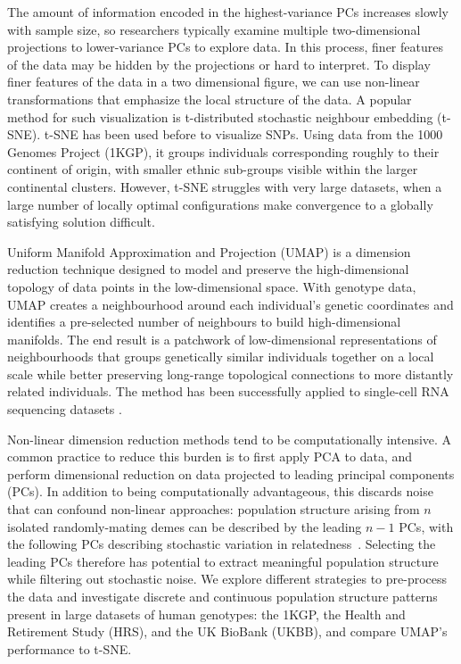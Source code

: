 The amount of information encoded in the highest-variance PCs increases slowly with sample size, so researchers typically examine multiple two-dimensional projections to lower-variance PCs to explore data. In this process, finer features of the data may be hidden by the projections or hard to interpret. To display finer features of the data in a two dimensional figure, we can use non-linear transformations that emphasize the local structure of the data. A popular method for such visualization is t-distributed stochastic neighbour embedding (t-SNE)\citep{maaten_visualizing_2008}. t-SNE has been used before to visualize SNPs\citep{platzer2013visualization}. Using data from the 1000 Genomes Project (1KGP)\citep{10002015global}, it groups individuals corresponding roughly to their continent of origin, with smaller ethnic sub-groups visible within the larger continental clusters\citep{li2017tsne}. However, t-SNE struggles with very large datasets, when a large number of locally optimal configurations make convergence to a globally satisfying solution difficult.

Uniform Manifold Approximation and Projection (UMAP) is a dimension reduction technique designed to model and preserve the high-dimensional topology of data points in the low-dimensional space\citep{2018arXivUMAP}. With genotype data, UMAP creates a neighbourhood around each individual's genetic coordinates and identifies a pre-selected number of neighbours to build high-dimensional manifolds. The end result is a patchwork of low-dimensional representations of neighbourhoods that groups genetically similar individuals together on a local scale while better preserving long-range topological connections to more distantly related individuals. The method has been successfully applied to single-cell RNA sequencing datasets \citep{umap2018singlecell}.

Non-linear dimension reduction methods tend to be computationally intensive. A common practice to reduce this burden is to first apply PCA to data, and perform dimensional reduction on data projected to leading principal components (PCs). In addition to being computationally advantageous, this discards noise that can confound non-linear approaches: population structure arising from $n$ isolated randomly-mating demes can be described by the leading $n-1$ PCs, with the following PCs describing stochastic variation in relatedness~\citep{eigen2006}. Selecting the leading PCs therefore has potential to extract meaningful population structure while filtering out stochastic noise. We explore different strategies to pre-process the data and investigate discrete and continuous population structure patterns present in large datasets of human genotypes: the 1KGP, the Health and Retirement Study (HRS)\citep{juster1995overview}, and the UK BioBank (UKBB)\citep{sudlow2015uk}, and compare UMAP's performance to t-SNE.  

